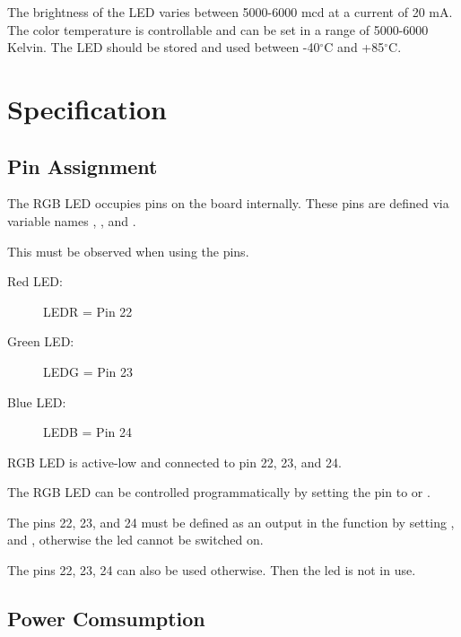 \bigskip



The brightness of the LED varies between 5000-6000 \ac{mcd} at a current of 20 mA. The color temperature is controllable and can be set in a range of 5000-6000 Kelvin. The LED should be stored and used between -40$^\circ$C and +85$^\circ$C.



\section{Specification}

\subsection{Pin Assignment}

The RGB LED occupies pins on the board internally. These pins are defined via variable names , , and . \cite{Arduino:2023a,Arduino:2023}

This must be observed when using the pins.



\begin{description}
    \item [Red LED:] LEDR = Pin 22
    \item [Green LED:] LEDG = Pin 23
    \item [Blue LED:] LEDB = Pin 24
\end{description}


RGB LED is active-low and connected to pin 22, 23, and 24.

The RGB LED can be controlled programmatically by setting the pin to  or . 



The pins 22, 23, and 24 must be defined as an output in the function  by setting ,  and , otherwise the \ac{led} cannot be switched on.

\medskip 


The pins 22, 23, 24 can also be used otherwise. Then the \ac{led} is not in use.

\subsection{Power Comsumption}


